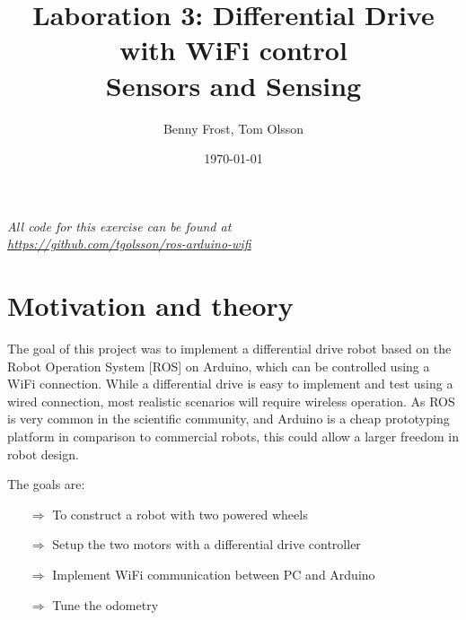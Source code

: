 \documentclass[11pt]{article}
\title{Laboration 3: Differential Drive with WiFi control\\ {\small Sensors and
    Sensing}} \author{Benny Frost, Tom Olsson} \date{\today}
\begin{document}
\maketitle %
\begin{center}
  \emph{All code for this exercise can be found at \\
    \url{https://github.com/tgolsson/ros-arduino-wifi}}
\end{center}
\tableofcontents
\lstlistoflistings %
\listoffigures %
\listoftables \lstset{
  matchrangestart=t} %


\section{Motivation and theory}
The goal of this project was to implement a differential drive robot based on
the Robot Operation System [ROS] on Arduino, which can be controlled using a
WiFi connection. While a differential drive is easy to implement and test using
a wired connection, most realistic scenarios will require wireless operation. As
ROS is very common in the scientific community, and Arduino is a cheap
prototyping platform in comparison to commercial robots, this could allow a
larger freedom in robot design. \par

The goals are:
\begin{itemize}
\item[$\Rightarrow$] To construct a robot with two powered wheels
\item[$\Rightarrow$] Setup the two motors with a differential drive controller
\item[$\Rightarrow$] Implement WiFi communication between PC and Arduino
\item[$\Rightarrow$] Tune the odometry
\end{itemize}
\end{document}
